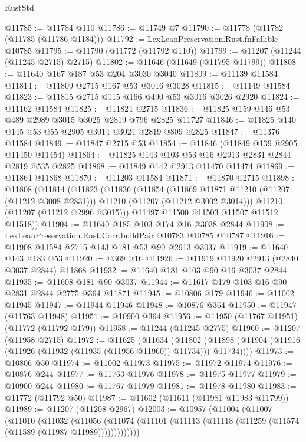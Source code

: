 \begin{lexlean}{RustStd}
\begin{coremodule}
@11785 := @11784 @110
@11786 := @11749 @7
@11790 := @11778 (@11782 (@11785 (@11786 @1184)))
@11792 := LexLeanPreservation.Rust.fnFallible @10785
@11795 := @11790 (@11772 (@11792 @110))
@11799 := @11207 (@11244 (@11245 @2715) @2715)
@11802 := @11646 (@11649 (@11795 @11799))
@11808 := @11640 @167 @187 @53 @204 @3030 @3040
@11809 := @11139 @11584
@11814 := @11809 @2715 @167 @53 @3016 @3028
@11815 := @11149 @11584
@11823 := @11815 @2715 @115 @166 @490 @53 @3016 @3026 @2920
@11824 := @11162 @11584
@11825 := @11824 @2715
@11836 := @11825 @159 @146 @53 @489 @2989 @3015 @3025 @2819 @796 @2825 @11727
@11846 := @11825 @140 @145 @53 @55 @2905 @3014 @3024 @2819 @809 @2825
@11847 := @11376 @11584
@11849 := @11847 @2715 @53
@11854 := @11846 (@11849 @139 @2905 @11450 @11454)
@11864 := @11825 @143 @103 @53 @16 @2913 @2831 @2844 @2819 @535 @2825
@11868 := @11849 @142 @2913 @11470 @11474
@11869 := @11864 @11868
@11870 := @11203 @11584
@11871 := @11870 @2715
@11898 := @11808
    (@11814
      (@11823
        (@11836
          (@11854
            (@11869 @11871 @11210 (@11207 (@11212 @3008 @2831)))
            @11210
            (@11207 (@11212 @3002 @3014)))
          @11210
          (@11207 (@11212 @2996 @3015)))
        @11497
        @11500
        @11503
        @11507
        @11512
        @11518))
@11904 := @11640 @185 @103 @174 @16 @3038 @2844
@11908 := LexLeanPreservation.Rust.Corr.buildPair @10783 @10785 @10787
@11916 := @11908 @11584 @2715 @143 @181 @53 @90 @2913 @3037
@11919 := @11640 @143 @183 @53
@11920 := @369 @16
@11926 := @11919 @11920 @2913 (@2840 @3037 @2844) @11868
@11932 := @11640 @181 @103 @90 @16 @3037 @2844
@11935 := @11608 @181 @90 @3037
@11944 := @11617 @179 @103 @16 @90 @2831 @2844 @2775 @364 @11871
@11945 := @10806 @179
@11946 := @11002 @11945
@11947 := @11944 @11946
@11948 := @10876 @364
@11950 := @11947 (@11763 @11948)
@11951 := @10900 @364
@11956 := @11950 (@11767 @11951) (@11772 (@11792 @179))
@11958 := @11244 (@11245 @2775)
@11960 := @11207 (@11958 @2715)
@11972 := @11625
    (@11634
      (@11802 (@11898 (@11904 (@11916 (@11926 (@11932 (@11935 (@11956 @11960)) @11734))) @11734))))
@11973 := @10806 @50
@11974 := @11002 @11973
@11975 := @11972 @11974
@11976 := @10876 @244
@11977 := @11763 @11976
@11978 := @11975 @11977
@11979 := @10900 @244
@11980 := @11767 @11979
@11981 := @11978 @11980
@11983 := @11772 (@11792 @50)
@11987 := @11602 (@11611 (@11981 @11983 @11799))
@11989 := @11207 (@11208 @2967)
@12003 := @10957
    (@11004
      (@11007
        (@11010
          (@11032
            (@11056
              (@11074 (@11101 (@11113 (@11118 (@11259 (@11574 (@11589 (@11987 @11989)))))))))))))

\end{coremodule}
\end{lexlean}
